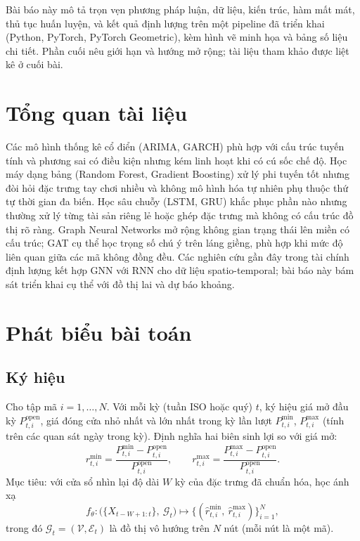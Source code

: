 \documentclass[12pt,a4paper]{article}
\begin{document}
Bài báo này mô tả trọn vẹn phương pháp luận, dữ liệu, kiến trúc, hàm mất mát, thủ tục huấn luyện, và kết quả định lượng trên một pipeline đã triển khai (Python, PyTorch, PyTorch Geometric), kèm hình vẽ minh họa và bảng số liệu chi tiết. Phần cuối nêu giới hạn và hướng mở rộng; tài liệu tham khảo được liệt kê ở cuối bài.

\section{Tổng quan tài liệu}

Các mô hình thống kê cổ điển (ARIMA, GARCH) phù hợp với cấu trúc tuyến tính và phương sai có điều kiện nhưng kém linh hoạt khi có cú sốc chế độ. Học máy dạng bảng (Random Forest, Gradient Boosting) xử lý phi tuyến tốt nhưng đòi hỏi đặc trưng tay chơi nhiều và không mô hình hóa tự nhiên phụ thuộc thứ tự thời gian đa biến. Học sâu chuỗy (LSTM, GRU) khắc phục phần nào nhưng thường xử lý từng tài sản riêng lẻ hoặc ghép đặc trưng mà không có cấu trúc đồ thị rõ ràng. Graph Neural Networks mở rộng không gian trạng thái lên miền có cấu trúc; GAT cụ thể học trọng số chú ý trên láng giềng, phù hợp khi mức độ liên quan giữa các mã không đồng đều. Các nghiên cứu gần đây trong tài chính định lượng kết hợp GNN với RNN cho dữ liệu spatio-temporal; bài báo này bám sát triển khai cụ thể với đồ thị lai và dự báo khoảng.

\section{Phát biểu bài toán}

\subsection{Ký hiệu}
Cho tập mã $i=1,\ldots,N$. Với mỗi kỳ (tuần ISO hoặc quý) $t$, ký hiệu giá mở đầu kỳ $P^{\mathrm{open}}_{t,i}$, giá đóng cửa nhỏ nhất và lớn nhất trong kỳ lần lượt $P^{\min}_{t,i}$, $P^{\max}_{t,i}$ (tính trên các quan sát ngày trong kỳ). Định nghĩa hai biên sinh lợi so với giá mở:
\begin{equation}
  r^{\min}_{t,i} = \frac{P^{\min}_{t,i} - P^{\mathrm{open}}_{t,i}}{P^{\mathrm{open}}_{t,i}}, \qquad
  r^{\max}_{t,i} = \frac{P^{\max}_{t,i} - P^{\mathrm{open}}_{t,i}}{P^{\mathrm{open}}_{t,i}}.
\end{equation}
Mục tiêu: với cửa sổ nhìn lại độ dài $W$ kỳ của đặc trưng đã chuẩn hóa, học ánh xạ
\begin{equation}
  f_\theta: \big( \{X_{t-W+1:t}\},\ \mathcal{G}_t \big) \mapsto \{(\hat r^{\min}_{t,i},\ \hat r^{\max}_{t,i})\}_{i=1}^N,
\end{equation}
trong đó $\mathcal{G}_t=(\mathcal{V},\mathcal{E}_t)$ là đồ thị vô hướng trên $N$ nút (mỗi nút là một mã).
\end{document}
